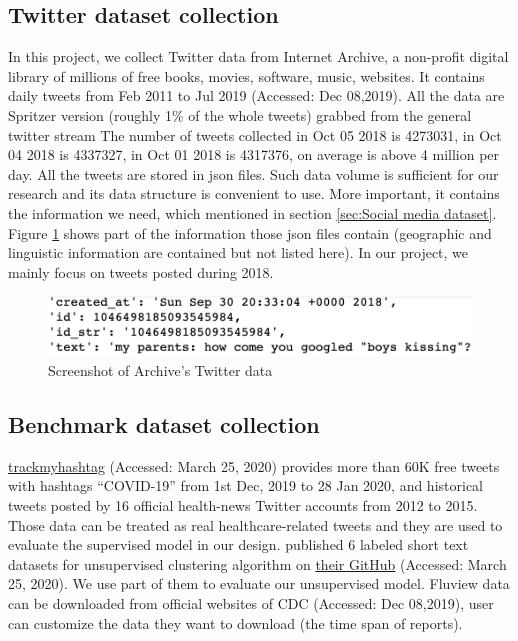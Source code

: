 \subsection{Twitter dataset collection}
\label{sec:Twitter dataset}
In this project, we collect Twitter data from Internet Archive\cite{archive}, a non-profit digital library of millions of free books, movies, software, music, websites. It contains daily tweets from Feb 2011 to Jul 2019 (Accessed: Dec 08,2019). All the data are Spritzer version (roughly 1\% of the whole tweets) grabbed from the general twitter stream The number of tweets collected in Oct 05 2018 is 4273031, in Oct 04 2018 is 4337327, in Oct 01 2018 is 4317376, on average is above 4 million per day. All the tweets are stored in json files. Such data volume is sufficient for our research and its data structure is convenient to use. More important, it contains the information we need, which mentioned in section \ref{sec:Social media dataset}. Figure \ref{fig:archive1} shows part of the information those json files contain (geographic and linguistic information are contained but not listed here). In our project, we mainly focus on tweets posted during 2018.\\
\begin{figure}[!htbp]
    \center
    \includegraphics[width=5.5in]{images/archive1.png}
    \caption{Screenshot of Archive's Twitter data}
    \label{fig:archive1}
\end{figure} 

\subsection{Benchmark dataset collection}
\href{https://www.trackmyhashtag.com/blog/twitter-datasets-free/}{trackmyhashtag} (Accessed: March 25, 2020) provides more than 60K free tweets with hashtags ``COVID-19'' from 1st Dec, 2019 to 28 Jan 2020, and historical tweets posted by 16 official health-news Twitter accounts from 2012 to 2015. Those data can be treated as real healthcare-related tweets and they are used to evaluate the supervised model in our design. \cite{qiang2018STTP} published 6 labeled short text datasets for unsupervised clustering algorithm on \href{https://github.com/qiang2100/STTM}{their GitHub} (Accessed: March 25, 2020). We use part of them to evaluate our unsupervised model. Fluview data can be downloaded from official websites of CDC \cite{cdc:fluView} (Accessed: Dec 08,2019), user can customize the data they want to download (the time span of reports). 

